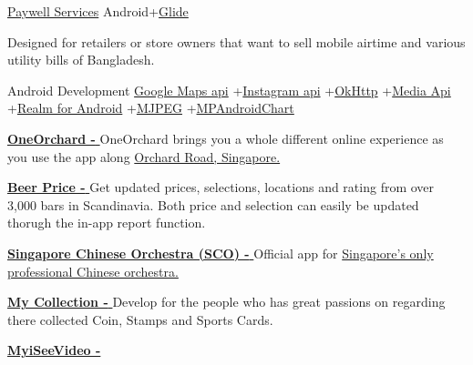 \begin{projectentries}
    \projectentry 
    {\href{https://play.google.com/store/apps/details?id=com.cloudwell.paywell.services}{Paywell Services}} 
    {Android+{\href{https://github.com/bumptech/glide}{Glide}}}
    {
      \begin{projectitems} %
        \item {Designed for retailers or store owners that want to sell mobile airtime and various utility bills of Bangladesh.}
      \end{projectitems}
    }

    \projectentry 
    {Android Development} 
    {{\href{https://developers.google.com/maps/documentation/android-sdk/start}{Google Maps api}}
    +{\href{https://www.instagram.com/developer/}{Instagram api}}
    +{\href{http://square.github.io/okhttp/}{OkHttp}}
    +{\href{https://developer.android.com/guide/topics/media/}{Media Api}}
    +{\href{https://realm.io/docs/java/latest/}{Realm for Android}}
    +{\href{https://en.wikipedia.org/wiki/Motion_JPEG}{MJPEG}}
    +{\href{https://github.com/PhilJay/MPAndroidChart}{MPAndroidChart}}}
    {
      \begin{projectitems} %
        \item {{\href{https://play.google.com/store/apps/details?id=com.orba.OneOrchard}{\textbf{OneOrchard - }}}
        OneOrchard brings you a whole different online experience as you use the app along 
        {\href{http://www.orchardroad.org/}{Orchard Road, Singapore.}}}
        \item {{\href{https://annanovas.com/portfolio/beer-prices-android/}{\textbf{Beer Price - }}}
        Get updated prices, selections, locations and rating from over 3,000 bars in Scandinavia. Both price and selection can easily be 
        updated thorugh the in-app report function.}  
        \item {{\href{https://play.google.com/store/apps/details?id=com.SingaporeChineseOrchestra.SCO}{\textbf{Singapore Chinese Orchestra (SCO) - }}}
        Official app for 
        {\href{https://www.sco.com.sg}{Singapore’s only professional Chinese orchestra.}}}  
        \item {{\href{https://annanovas.com/portfolio/my-collection/}{\textbf{My Collection - }}}
        Develop for the people who has great passions on regarding there collected Coin, Stamps and Sports Cards.}  
        \item {{\href{https://play.google.com/store/apps/details?id=com.napco.uidealer.myiseevideo}{\textbf{MyiSeeVideo - }}}
}
\end{projectitems}}
\end{projectentries}
